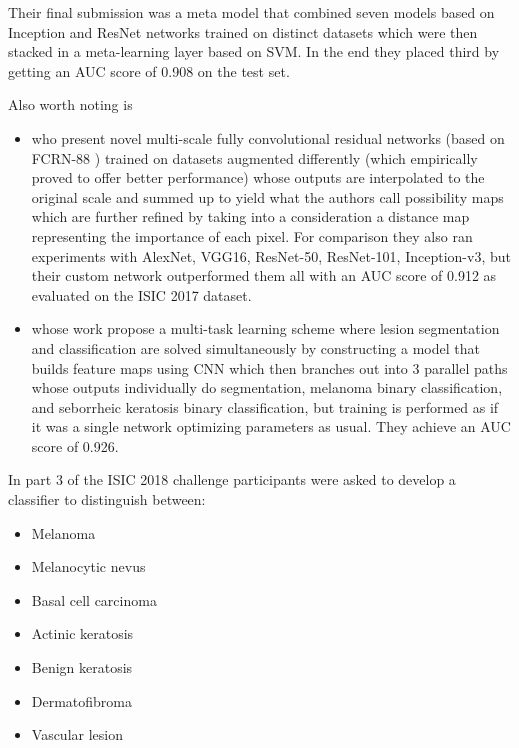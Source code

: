 Their final submission was a meta model that combined seven models based on Inception and ResNet networks trained on distinct datasets which were then stacked in a meta-learning layer based on SVM. In the end they placed third by getting an AUC score of 0.908 on the test set.

Also worth noting is

\begin{itemize}
    \item \citeauthor{isic2017li} \cite{isic2017li} who present novel multi-scale fully convolutional residual networks (based on FCRN-88 \cite{fcrn}) trained on datasets augmented differently (which empirically proved to offer better performance) whose outputs are interpolated to the original scale and summed up to yield what the authors call possibility maps which are further refined by taking into a consideration a distance map representing the importance of each pixel. For comparison they also ran experiments with AlexNet, VGG16, ResNet-50, ResNet-101, Inception-v3, but their custom network outperformed them all with an AUC score of 0.912 as evaluated on the \ac{ISIC} 2017 dataset.
    \item \citeauthor{yang2017} \cite{yang2017} whose work propose a multi-task learning scheme where lesion segmentation and classification are solved simultaneously by constructing a model that builds feature maps using \ac{CNN} which then branches out into 3 parallel paths whose outputs individually do segmentation, melanoma binary classification, and seborrheic keratosis binary classification, but training is performed as if it was a single network optimizing parameters as usual. They achieve an AUC score of 0.926.
\end{itemize}

In part 3 of the \ac{ISIC} 2018 challenge participants were asked to develop a classifier to distinguish between:

\begin{itemize}
    \item Melanoma
    \item Melanocytic nevus
    \item Basal cell carcinoma
    \item Actinic keratosis
    \item Benign keratosis
    \item Dermatofibroma
    \item Vascular lesion
\end{itemize}

